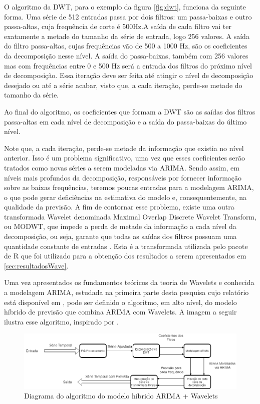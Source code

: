 \documentclass[12pt]{article}
\begin{document}
	O algoritmo da \textrm{DWT}, para o exemplo da figura \ref{fig:dwt}, funciona da seguinte forma. Uma série de 512 entradas passa por dois filtros: um passa-baixas e outro passa-altas, cuja frequência de corte é 500Hz.A saída de cada filtro vai ter exatamente a metade do tamanho da série de entrada, logo 256 valores. A saída do filtro passa-altas, cujas frequências vão de 500 a 1000 Hz, são os coeficientes da decomposição nesse nível. A saída do passa-baixas, também com 256 valores mas com frequências entre 0 e 500 Hz será a entrada dos filtros do próximo nível de decomposição. Essa iteração deve ser feita até atingir o nível de decomposição desejado ou até a série acabar, visto que, a cada iteração, perde-se metade do tamanho da série.
	
	Ao final do algoritmo, os coeficientes que formam a \textrm{DWT} são as saídas dos filtros passa-altas em cada nível de decomposição e a saída do passa-baixas do último nível.
	
	Note que, a cada iteração, perde-se metade da informação que existia no nível anterior. Isso é um problema significativo, uma vez que esses coeficientes serão tratados como novas séries a serem modeladas via ARIMA. Sendo assim, em níveis mais profundos da decomposição, responsáveis por fornecer informação sobre as baixas frequências, teremos poucas entradas para a modelagem ARIMA, o que pode gerar deficiências na estimativa do modelo e, consequentemente, na qualidade da previsão. A fim de contornar esse problema, existe uma outra transformada \textrm{Wavelet} denominada \textrm{Maximal Overlap Discrete Wavelet Transform}, ou MODWT, que impede a perda de metade da informação a cada nível da decomposição, ou seja, garante que todas as saídas dos filtros possuam uma quantidade constante de entradas \cite{WaveARIMA}. Esta é a transformada utilizada pelo pacote de R que foi utilizado para a obtenção dos resultados a serem apresentados em \ref{sec:resultadosWave}.
	
	Uma vez apresentados os fundamentos teóricos da teoria de \textrm{Wavelets} e conhecida a modelagem ARIMA, estudada na primeira parte desta pesquisa cujo relatório está disponível em \cite{git}, pode ser definido o algoritmo, em alto nível, do modelo híbrido de previsão que combina ARIMA com \textrm{Wavelets}. A imagem a seguir ilustra esse algoritmo, inspirado por \cite{WaveARIMA}.
	\begin{figure}[H]
		\centering
		\includegraphics[width=1.0\linewidth]{Imagens/diagramaModeloHibrido}
		\caption{Diagrama do algoritmo do modelo híbrido ARIMA + Wavelets}
		\label{fig:diagramawaveletsARIMA}
	\end{figure}
	
\end{document}

